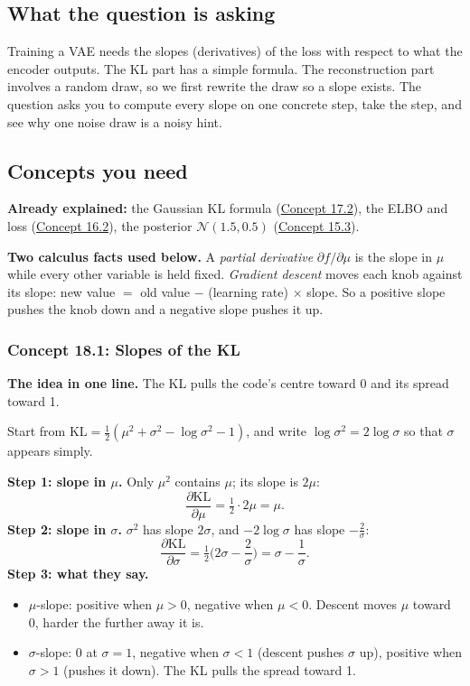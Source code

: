 \documentclass[12pt,a4paper]{article}
\begin{document}
\subsection{What the question is asking}

Training a VAE needs the slopes (derivatives) of the loss with respect to what the encoder outputs. The KL part has a simple formula. The reconstruction part involves a random draw, so we first rewrite the draw so a slope exists. The question asks you to compute every slope on one concrete step, take the step, and see why one noise draw is a noisy hint.

\subsection{Concepts you need}

\textbf{Already explained:} the Gaussian KL formula (\hyperref[c17-2]{Concept 17.2}), the ELBO and loss (\hyperref[c16-2]{Concept 16.2}), the posterior $\mathcal{N}(1.5,0.5)$ (\hyperref[c15-3]{Concept 15.3}).

\textbf{Two calculus facts used below.} A \emph{partial derivative} $\partial f/\partial\mu$ is the slope in $\mu$ while every other variable is held fixed. \emph{Gradient descent} moves each knob against its slope: new value $=$ old value $-$ (learning rate) $\times$ slope. So a positive slope pushes the knob down and a negative slope pushes it up.

\subsubsection{Concept 18.1: Slopes of the KL}\label{c18-1}

\textbf{The idea in one line.} The KL pulls the code's centre toward 0 and its spread toward 1.

Start from $\mathrm{KL}=\frac12(\mu^2+\sigma^2-\log\sigma^2-1)$, and write $\log\sigma^2=2\log\sigma$ so that $\sigma$ appears simply.

\textbf{Step 1: slope in $\mu$.} Only $\mu^2$ contains $\mu$; its slope is $2\mu$:
\[
\frac{\partial\mathrm{KL}}{\partial\mu}=\tfrac12\cdot2\mu=\mu .
\]
\textbf{Step 2: slope in $\sigma$.} $\sigma^2$ has slope $2\sigma$, and $-2\log\sigma$ has slope $-\frac2\sigma$:
\[
\frac{\partial\mathrm{KL}}{\partial\sigma}=\tfrac12\Big(2\sigma-\frac{2}{\sigma}\Big)=\sigma-\frac1\sigma .
\]
\textbf{Step 3: what they say.}
\begin{itemize}[nosep]
  \item $\mu$-slope: positive when $\mu>0$, negative when $\mu<0$. Descent moves $\mu$ toward 0, harder the further away it is.
  \item $\sigma$-slope: 0 at $\sigma=1$, negative when $\sigma<1$ (descent pushes $\sigma$ up), positive when $\sigma>1$ (pushes it down). The KL pulls the spread toward 1.
\end{itemize}
\end{document}
